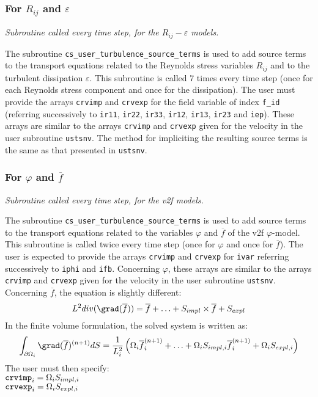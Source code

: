 {{{%
\subsubsection{For $R_{ij}$ and $\varepsilon$}

\noindent
\textit{Subroutine called every time step, for the $R_{ij}-\varepsilon$ models.}

The subroutine \texttt{cs\_user\_turbulence\_source\_terms} is used to add source terms to the transport equations
related to the Reynolds stress variables $R_{ij}$ and to the turbulent
dissipation $\varepsilon$.
This subroutine is called 7 times every time step
(once for each Reynolds stress component and once for the
dissipation). The user must provide the arrays \texttt{crvimp} and
\texttt{crvexp} for the field variable of index \texttt{f\_id} (referring successively to
\texttt{ir11}, \texttt{ir22}, \texttt{ir33},
\texttt{ir12}, \texttt{ir13}, \texttt{ir23} and
\texttt{iep}). These arrays are similar to the arrays \texttt{crvimp}
and \texttt{crvexp} given for the velocity in the user subroutine
\texttt{ustsnv}. The method for impliciting the resulting source terms is the
same as that presented in \texttt{ustsnv}.

\subsubsection{For $\varphi$ and $\overline{f}$}
\label{sec:prg_ustsv2}

\noindent
\textit{Subroutine called every time step, for the v2f models.}

The subroutine \texttt{cs\_user\_turbulence\_source\_terms} is used to add source terms to the transport equations
related to the variables $\varphi$ and $\overline{f}$ of the v2f
$\varphi$-model. This subroutine is called twice
every time step (once for $\varphi$ and once for $\overline{f}$).
The user is expected to provide the arrays \texttt{crvimp} and
\texttt{crvexp} for \texttt{ivar} referring successively to \texttt{iphi}
and \texttt{ifb}. Concerning $\varphi$, these arrays are similar to the arrays
\texttt{crvimp} and \texttt{crvexp} given for the velocity in the user subroutine
\texttt{ustsnv}. Concerning $\overline{f}$, the equation is slightly
different:
\begin{displaymath}
L^2 div(\grad(\overline{f})) = \overline{f} + \ldots + S_{impl}\times\overline{f}+S_{expl}
\end{displaymath}
In the finite volume formulation, the solved system is written as:
\begin{displaymath}
\int_{\partial\Omega_i}\grad(\overline{f})^{(n+1)}dS=\frac{1}{L_i^2}\left(
\Omega_i\overline{f}^{(n+1)}_i + \ldots +  \Omega_iS_{impl,i}\overline{f}_i^{(n+1)} +
\Omega_iS_{expl,i} \right)
\end{displaymath}
The user must then specify:\\
$\text{\texttt{crvimp}}_i=\Omega_iS_{impl,i}$\\
$\text{\texttt{crvexp}}_i=\Omega_iS_{expl,i}$

}}}
